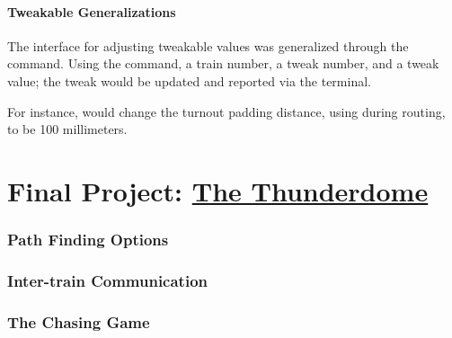 \documentclass[pdftex,10pt,a4paper]{article}
\begin{document}
\subsection*{Tweakable Generalizations}

The interface for adjusting tweakable values was generalized through
the  command. Using the command, a train number, a tweak
number, and a tweak value; the tweak would be updated and reported
via the terminal.

For instance,  would change the turnout padding
distance, using during routing, to be 100 millimeters.

\part*{Final Project: \underline{The Thunderdome}}

\section*{Path Finding Options}

\section*{Inter-train Communication}

\section*{The Chasing Game}
\end{document}
